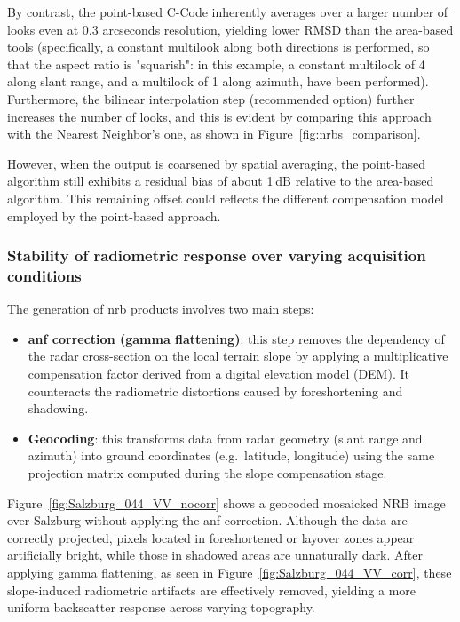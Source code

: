By contrast, the point-based C-Code inherently averages over a larger number of looks even at $0.3$ arcseconds resolution, yielding lower RMSD than the area-based tools (specifically, a constant multilook along both directions is performed, so that the aspect ratio is "squarish": in this example, a constant multilook of 4 along slant range, and a multilook of 1 along azimuth, have been performed). Furthermore, the bilinear interpolation step (recommended option) further increases the number of looks, and this is evident by comparing this approach with the Nearest Neighbor's one, as shown in Figure~\ref{fig:nrbs_comparison}.

However, when the output is coarsened by spatial averaging, the point-based algorithm still exhibits a residual bias of about 1 dB relative to the area-based algorithm. This remaining offset could reflects the different compensation model employed by the point-based approach.

\subsubsection{Stability of radiometric response over varying acquisition conditions}
\label{sec:nrb_stability_diff_geom}
The generation of \acs{nrb} products involves two main steps:

\begin{itemize}
    \item \textbf{\acs{anf} correction (gamma flattening)}: this step removes the dependency of the radar cross-section on the local terrain slope by applying a multiplicative compensation factor derived from a digital elevation model (DEM). It counteracts the radiometric distortions caused by foreshortening and shadowing.  
    \item \textbf{Geocoding}: this transforms data from radar geometry (slant range and azimuth) into ground coordinates (e.g.\ latitude, longitude) using the same projection matrix computed during the slope compensation stage.  
\end{itemize}

Figure~\ref{fig:Salzburg_044_VV_nocorr} shows a geocoded mosaicked NRB image over Salzburg without applying the \acs{anf} correction. Although the data are correctly projected, pixels located in foreshortened or layover zones appear artificially bright, while those in shadowed areas are unnaturally dark. After applying gamma flattening, as seen in Figure~\ref{fig:Salzburg_044_VV_corr}, these slope-induced radiometric artifacts are effectively removed, yielding a more uniform backscatter response across varying topography.

